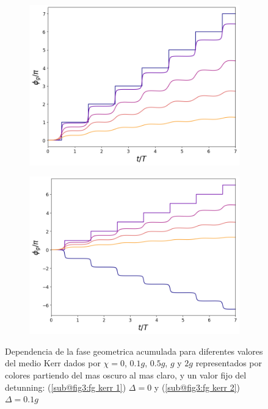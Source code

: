 \begin{figure}[H]
    \centering
    \begin{subfigure}{0.49\textwidth}
        \centering
        \includegraphics[width=\textwidth]{figuras/ch3/fg kerr.png}
        \caption{}
        \label{fig3:fg kerr 1}
    \end{subfigure}
    \hfill
    \begin{subfigure}{0.49\textwidth}
        \centering
        \includegraphics[width=\textwidth]{figuras/ch3/fg kerr d=0.1g.png}
        \caption{}
        \label{fig3:fg kerr 2}
    \end{subfigure}
    \caption{Dependencia de la fase geometrica acumulada para diferentes valores del medio Kerr dados por $\chi=0$, $0.1g$, $0.5g$, $g$ y $2g$ representados por colores partiendo del mas oscuro al mas claro, y un valor fijo del detunning: (\ref{sub@fig3:fg kerr 1}) $\Delta=0$ y (\ref{sub@fig3:fg kerr 2}) $\Delta=0.1g$}
\end{figure}

